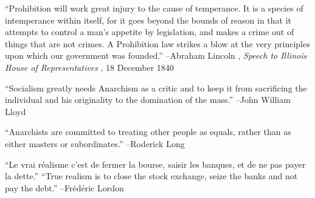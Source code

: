 \documentclass{article}%
\begin{document}
\begin{minipage}{\textwidth}%
\flushleft%
“Prohibition will work great injury to the cause of temperance. It is a species of intemperance within itself, for it goes beyond the bounds of reason in that it attempts to control a man's appetite by legislation, and makes a crime out of things that are not crimes. A Prohibition law strikes a blow at the very principles upon which our government was founded.”%
\linebreak%
\vspace{1mm}%
–Abraham Lincoln%
, \textit{Speech to Illinois House of Representatives}%
, 18 December 1840%
\linebreak%
\vspace{1mm}%
\end{minipage}%
\linebreak%
\vspace{1mm}%
\begin{minipage}{\textwidth}%
\flushleft%
“Socialism greatly needs Anarchism as a critic and to keep it from sacrificing the individual and his originality to the domination of the mass.”%
\linebreak%
\vspace{1mm}%
–John William Lloyd%
\linebreak%
\vspace{1mm}%
\end{minipage}%
\linebreak%
\vspace{1mm}%
\begin{minipage}{\textwidth}%
\flushleft%
“Anarchists are committed to treating other people as equals, rather than as either masters or subordinates.”%
\linebreak%
\vspace{1mm}%
–Roderick Long%
\linebreak%
\vspace{1mm}%
\end{minipage}%
\linebreak%
\vspace{1mm}%
\begin{minipage}{\textwidth}%
\flushleft%
“Le vrai réalisme c'est de fermer la bourse, saisir les banques, et de ne pas payer la dette.”%
\linebreak%
\vspace{1mm}%
“True realism is to close the stock exchange, seize the banks and not pay the debt.”%
\linebreak%
–Frédéric Lordon%
\linebreak%
\vspace{1mm}%
\end{minipage}%
\end{document}
